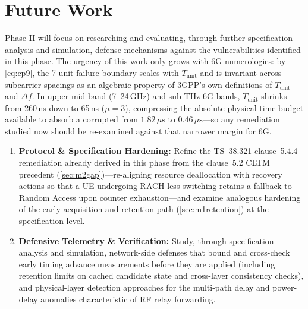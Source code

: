 \section{Future Work}
\label{sec:future}

Phase II will focus on researching and evaluating, through further specification analysis and simulation,
defense mechanisms against the vulnerabilities identified in this phase. The urgency of this work only
grows with 6G numerologies: by \cref{eq:cp9}, the 7-unit failure boundary scales with $T_{\mathrm{unit}}$
and is invariant across subcarrier spacings as an algebraic property of 3GPP's own definitions of
$T_{\mathrm{unit}}$ and $\Delta f$. In upper mid-band (7--24\,GHz) and sub-THz 6G bands, $T_{\mathrm{unit}}$
shrinks from 260\,ns down to 65\,ns ($\mu=3$), compressing the absolute physical time budget available to
absorb a corrupted \TA{} from $1.82\,\mu\text{s}$ to $0.46\,\mu\text{s}$---so any remediation studied now
should be re-examined against that narrower margin for 6G.

\begin{enumerate}\itemsep3pt
  \item \textbf{Protocol \& Specification Hardening:} Refine the TS~38.321 clause~5.4.4 remediation already
        derived in this phase from the clause~5.2 CLTM precedent (\cref{sec:m2gap})---re-aligning resource
        deallocation with recovery actions so that a UE undergoing RACH-less switching retains a fallback to
        Random Access upon counter exhaustion---and examine analogous hardening of the early \TA{} acquisition
        and retention path (\cref{sec:m1retention}) at the specification level.
  \item \textbf{Defensive Telemetry \& Verification:} Study, through specification analysis and simulation,
        network-side defenses that bound and cross-check early timing advance measurements before they are
        applied (including retention limits on cached candidate state and cross-layer consistency checks),
        and physical-layer detection approaches for the multi-path delay and power-delay anomalies
        characteristic of RF relay forwarding.
\end{enumerate}
